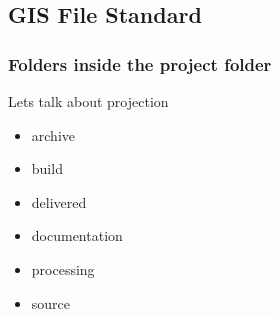 %
%
%
%
% 
\subsection{GIS File Standard}
\subsubsection{ Folders inside the project folder}
Lets talk about \gls{projection}
\begin{itemize}
\item archive
\item build
\item delivered
\item documentation
\item processing
\item source
\end{itemize}

